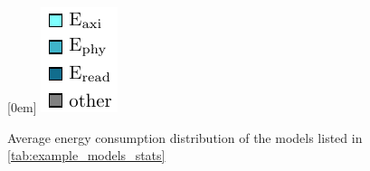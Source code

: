 \begin{figure}[hbtp]
    \centering
    \hfill
    \subcaptionbox*{}[0em]{
        \includegraphics{assets/legend.pdf}
    }
    \hfill
    \caption{Average energy consumption distribution of the models listed in \cref{tab:example_models_stats}}
    \label{fig:example_models_avg_conf_proc}
\end{figure}
    